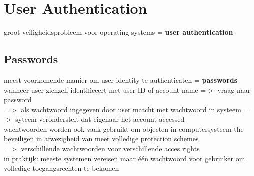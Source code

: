 \documentclass{report}
\begin{document}
\section{User Authentication}
groot veiligheidsprobleem voor operating systems = \textbf{user authentication}
\subsection{Passwords}
meest voorkomende manier om user identity te authenticaten  = \textbf{passwords}
\\wanneer user zichzelf identificeert met user ID of account name =$>$ vraag naar password
\\ =$>$ als wachtwoord ingegeven door user matcht met wachtwoord in systeem =$>$ syteem veronderstelt dat eigenaar het account accessed
\\wachtwoorden worden ook vaak gebruikt om objecten in computersysteem the beveiligen in afwezigheid van meer volledige protection schemes
\\=$>$ verschillende wachtwoorden voor verschillende acces rights
\\in praktijk: meeste systemen vereisen maar \'e\'en wachtwoord voor gebruiker om volledige toegangsrechten te bekomen
\end{document}
